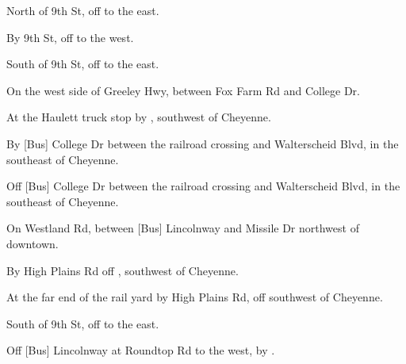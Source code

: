 

\begin{LocationList}

North of 9th St, off   to the east.

By 9th St, off   to the west.

South of 9th St, off   to the east.

On the west side of  Greeley Hwy, between Fox Farm Rd and College Dr.

At the Haulett truck stop by  , southwest of Cheyenne.

By [Bus]  College Dr between the railroad crossing and Walterscheid Blvd, in the southeast of Cheyenne.

Off [Bus]  College Dr between the railroad crossing and Walterscheid Blvd, in the southeast of Cheyenne.

On Westland Rd, between [Bus] Lincolnway and Missile Dr northwest of downtown.

By High Plains Rd off  , southwest of Cheyenne.

At the far end of the rail yard by High Plains Rd, off   southwest of Cheyenne.

South of 9th St, off   to the east.

Off [Bus] Lincolnway at  Roundtop Rd to the west, by  .

\end{LocationList}
